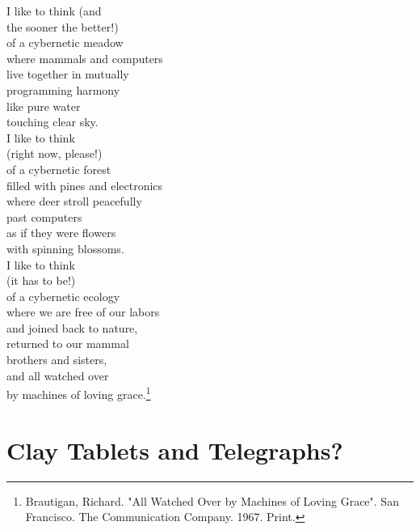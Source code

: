 \documentclass[11pt]{article}
\begin{document}
\begin{singlespace}
\noindent I like to think (and\\
the sooner the better!)\\
of a cybernetic meadow\\
where mammals and computers\\
live together in mutually\\
programming harmony\\
like pure water\\
touching clear sky.\\

\noindent I like to think\\
\indent (right now, please!)\\
of a cybernetic forest\\
filled with pines and electronics\\
where deer stroll peacefully\\
past computers\\
as if they were flowers\\
with spinning blossoms. \\

\noindent I like to think\\
\indent (it has to be!)\\
of a cybernetic ecology\\
where we are free of our labors\\
and joined back to nature,\\
returned to our mammal\\
brothers and sisters,\\
and all watched over\\
by machines of loving grace.\footnote{Brautigan, Richard. "All Watched Over by Machines of Loving Grace". San Francisco. The Communication Company. 1967. Print. }
\end{singlespace}


\section{Clay Tablets and Telegraphs?}
\end{document}
